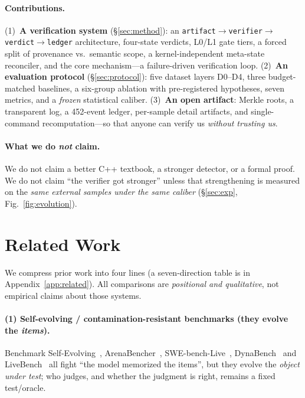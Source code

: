 \documentclass{article}
\begin{document}
\paragraph{Contributions.}
(1)~\textbf{A verification system} (\S\ref{sec:method}): an
\texttt{artifact}$\to$\texttt{verifier}$\to$\texttt{verdict}$\to$\texttt{ledger} architecture,
four-state verdicts, L0/L1 gate tiers, a forced split of provenance vs.\ semantic scope, a
kernel-independent meta-state reconciler, and the core mechanism---a failure-driven verification
loop.
(2)~\textbf{An evaluation protocol} (\S\ref{sec:protocol}): five dataset layers D0--D4,
three budget-matched baselines, a six-group ablation with pre-registered hypotheses, seven
metrics, and a \emph{frozen} statistical caliber.
(3)~\textbf{An open artifact}: Merkle roots, a transparent log, a 452-event ledger, per-sample
detail artifacts, and single-command recomputation---so that anyone can verify us
\emph{without trusting us}.

\paragraph{What we do \emph{not} claim.}
We do not claim a better C++ textbook, a stronger detector, or a formal proof. We do not claim
``the verifier got stronger'' unless that strengthening is measured on the \emph{same external
samples under the same caliber} (\S\ref{sec:exp}, Fig.~\ref{fig:evolution}).

\section{Related Work}
\label{sec:related}
We compress prior work into four lines (a seven-direction table is in Appendix~\ref{app:related}).
All comparisons are \emph{positional and qualitative}, not empirical claims about those systems.

\paragraph{(1) Self-evolving / contamination-resistant benchmarks (they evolve the \emph{items}).}
Benchmark Self-Evolving~\cite{wang2024benchmarkevolving}, ArenaBencher~\cite{liu2025arenabencher},
SWE-bench-Live~\cite{zhang2025swebenchlive}, DynaBench~\cite{kiela2021dynabench} and
LiveBench~\cite{white2024livebench} all fight ``the model memorized the items'', but they evolve
the \emph{object under test}; who judges, and whether the judgment is right, remains a fixed
test/oracle.
\end{document}
